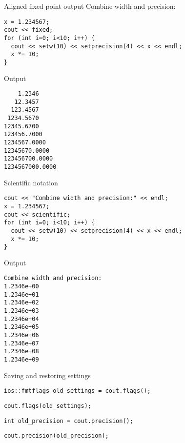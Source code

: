 \begin{block}{Aligned fixed point output}
  \label{sl:io-align}
  Combine width and precision:
\begin{verbatim}
x = 1.234567;
cout << fixed;
for (int i=0; i<10; i++) {
  cout << setw(10) << setprecision(4) << x << endl;
  x *= 10;
}
\end{verbatim}
\end{block}

\begin{block}{Output}
  \label{sl:io-align-out}
\begin{verbatim}
    1.2346
   12.3457
  123.4567
 1234.5670
12345.6700
123456.7000
1234567.0000
12345670.0000
123456700.0000
1234567000.0000
\end{verbatim}
\end{block}

\begin{block}{Scientific notation}
  \label{sl:io-sci}
\begin{verbatim}
cout << "Combine width and precision:" << endl;
x = 1.234567;
cout << scientific;
for (int i=0; i<10; i++) {
  cout << setw(10) << setprecision(4) << x << endl;
  x *= 10;
}
\end{verbatim}
\end{block}

\begin{block}{Output}
  \label{sl:io-sci-out}
\begin{verbatim}
Combine width and precision:
1.2346e+00
1.2346e+01
1.2346e+02
1.2346e+03
1.2346e+04
1.2346e+05
1.2346e+06
1.2346e+07
1.2346e+08
1.2346e+09
\end{verbatim}
\end{block}

 {Saving and restoring settings}

\begin{verbatim}
ios::fmtflags old_settings = cout.flags();
\end{verbatim}

\begin{verbatim}
cout.flags(old_settings);
\end{verbatim}

\begin{verbatim}
int old_precision = cout.precision();
\end{verbatim}

\begin{verbatim}
cout.precision(old_precision);
\end{verbatim}

